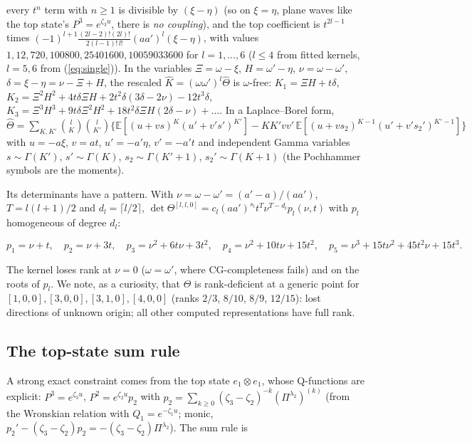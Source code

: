 \documentclass[11pt]{article}
\begin{document}
every $t^n$ term with $n\ge1$ is divisible by $(\xi-\eta)$ (so on $\xi=\eta$, plane waves like the top state's $P^3=e^{\zeta_3u}$, there is \emph{no coupling}), and the top coefficient is $t^{2l-1}$ times $(-1)^{l+1}\frac{(2l-2)!(2l)!}{2(l-1)!\,l!}(aa')^l(\xi-\eta)$, with values $1,12,720,100800,25401600,10059033600$ for $l=1,\dots,6$ ($l\le4$ from fitted kernels, $l=5,6$ from (\ref{eq:single})).
In the variables $\Xi=\omega-\xi$, $H=\omega'-\eta$, $\nu=\omega-\omega'$, $\delta=\xi-\eta=\nu-\Xi+H$, the rescaled $\hat K=(\omega\omega')^l\hat\Theta$ is $\omega$-free: $K_1=\Xi H+t\delta$, $K_2=\Xi^2H^2+4t\delta\Xi H+2t^2\delta(3\delta-2\nu)-12t^3\delta$, $K_3=\Xi^3H^3+9t\delta\Xi^2H^2+18t^2\delta\Xi H(2\delta-\nu)+\dots$. In a Laplace--Borel form, $\hat\Theta=\sum_{K,K'}\binom lK\binom l{K'}\{\mathbb E[(u+vs)^K(u'+v's')^{K'}]-KK'vv'\,\mathbb E[(u+vs_2)^{K-1}(u'+v's_2')^{K'-1}]\}$ with $u=-a\xi$, $v=at$, $u'=-a'\eta$, $v'=-a't$ and independent Gamma variables $s\sim\Gamma(K')$, $s'\sim\Gamma(K)$, $s_2\sim\Gamma(K'+1)$, $s_2'\sim\Gamma(K+1)$ (the Pochhammer symbols are the moments).

Its determinants have a pattern.
With $\nu=\omega-\omega'=(a'-a)/(aa')$, $T=l(l+1)/2$ and $d_l=\lceil l/2\rceil$, $\det\Theta^{[l,l,0]}=c_l(aa')^{s_l}t^T\nu^{T-d_l}p_l(\nu,t)$ with $p_l$ homogeneous of degree $d_l$:

\begin{equation}
p_1=\nu+t,\quad p_2=\nu+3t,\quad p_3=\nu^2+6t\nu+3t^2,\quad p_4=\nu^2+10t\nu+15t^2,\quad p_5=\nu^3+15t\nu^2+45t^2\nu+15t^3.\label{eq:pl}
\end{equation}

The kernel loses rank at $\nu=0$ ($\omega=\omega'$, where CG-completeness fails) and on the roots of $p_l$. We note, as a curiosity, that $\Theta$ is rank-deficient at a generic point for $[1,0,0],[3,0,0],[3,1,0],[4,0,0]$ (ranks $2/3$, $8/10$, $8/9$, $12/15$): lost directions of unknown origin; all other computed representations have full rank.

\subsection{The top-state sum rule}\label{sec:sumrule}

A strong exact constraint comes from the top state $e_1\otimes e_1$, whose Q-functions are explicit: $P^3=e^{\zeta_3u}$, $P^2=e^{\zeta_2u}p_2$ with $p_2=\sum_{k\ge0}(\zeta_3-\zeta_2)^{-k}(\Pi^{\lambda_2})^{(k)}$ (from the Wronskian relation with $Q_1=e^{-\zeta_1u}$; monic, $p_2'-(\zeta_3-\zeta_2)p_2=-(\zeta_3-\zeta_2)\Pi^{\lambda_2}$).
The sum rule is
\end{document}

